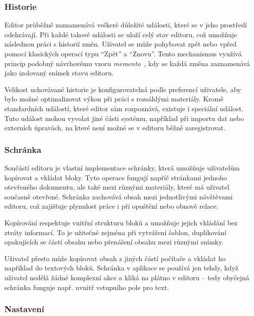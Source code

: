 \subsubsection{Historie}

Editor průběžně zaznamenává veškeré důležité události, které se v jeho prostředí odehrávají. 
Při každé takové události se uloží celý stav editoru, což umožňuje následnou práci s historií změn. 
Uživatel se může pohybovat zpět nebo vpřed pomocí klasických operací typu \enquote{Zpět} a \enquote{Znovu}. Tento mechanismus využívá princip podobný návrhovému vzoru \emph{memento}~\cite{kerievsky_2004}, kdy se každá změna zaznamenává jako izolovaný snímek stavu editoru.

Velikost uchovávané historie je konfigurovatelná podle preferencí uživatele, aby bylo možné optimalizovat výkon při práci s rozsáhlými materiály. 
Kromě standardních událostí, které editor sám rozpoznává, existuje i speciální událost.
Tuto událost mohou vyvolat jiné části systému, například při importu dat nebo externích úpravách, na které není možné se v editoru běžně zaregistrovat.

\subsubsection{Schránka}

Součástí editoru je vlastní implementace schránky, která umožňuje uživatelům kopírovat a vkládat bloky. 
Tyto operace fungují napříč stránkami jednoho otevřeného dokumentu, ale také mezi různými materiály, které má uživatel současně otevřené. 
Schránka zachovává obsah mezi jednotlivými návštěvami editoru, což zajišťuje plynulost práce i při opuštění nebo obnově relace.

Kopírování respektuje vnitřní strukturu bloků a umožňuje jejich vkládání bez ztráty informací. 
To je užitečné zejména při vytváření šablon, duplikování opakujících se částí obsahu nebo přenášení obsahu mezi různými snímky.

Uživatel přesto může kopírovat obsah z jiných částí počítače a vkládat ho například do textových bloků.
Schránka v aplikace se používá jen tehdy, když uživatel nedělá žádné komplexní akce a kliká na plátno v editoru -- tedy obyčejná schránka funguje např. uvnitř vstupního pole pro text.

\subsubsection{Nastavení}

